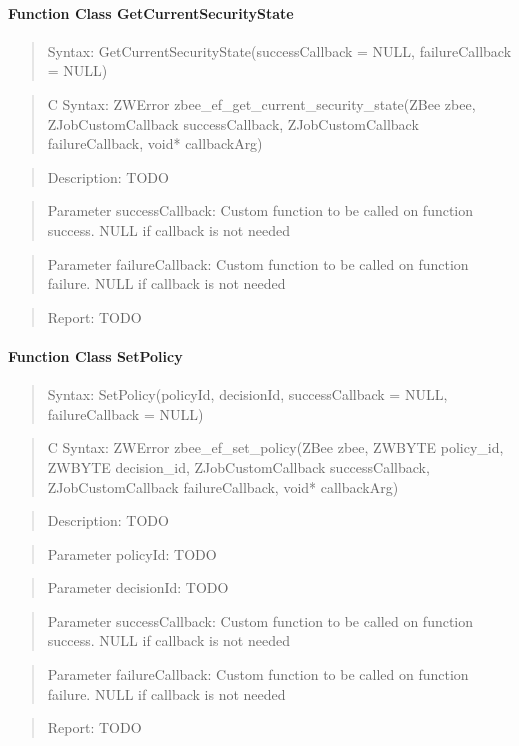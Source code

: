 \paragraph{Function Class GetCurrentSecurityState}
\begin{quote}Syntax: GetCurrentSecurityState(successCallback = NULL, failureCallback = NULL)\end{quote}
\begin{quote}C Syntax: ZWError zbee\_ef\_get\_current\_security\_state(ZBee zbee, ZJobCustomCallback successCallback, ZJobCustomCallback failureCallback, void* callbackArg)\end{quote}
\begin{quote}Description: TODO\end{quote}
\begin{quote}Parameter successCallback: Custom function to be called on function success. NULL if callback is not needed\end{quote}
\begin{quote}Parameter failureCallback: Custom function to be called on function failure. NULL if callback is not needed\end{quote}
\begin{quote}Report: TODO\end{quote}

\paragraph{Function Class SetPolicy}
\begin{quote}Syntax: SetPolicy(policyId, decisionId, successCallback = NULL, failureCallback = NULL)\end{quote}
\begin{quote}C Syntax: ZWError zbee\_ef\_set\_policy(ZBee zbee, ZWBYTE policy\_id, ZWBYTE decision\_id, ZJobCustomCallback successCallback, ZJobCustomCallback failureCallback, void* callbackArg)\end{quote}
\begin{quote}Description: TODO\end{quote}
\begin{quote}Parameter policyId: TODO\end{quote}
\begin{quote}Parameter decisionId: TODO\end{quote}
\begin{quote}Parameter successCallback: Custom function to be called on function success. NULL if callback is not needed\end{quote}
\begin{quote}Parameter failureCallback: Custom function to be called on function failure. NULL if callback is not needed\end{quote}
\begin{quote}Report: TODO\end{quote}

